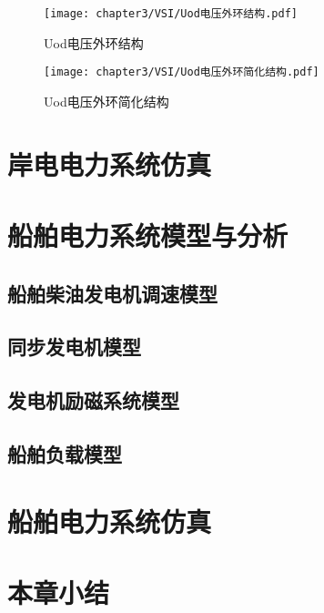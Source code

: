\begin{figure}[!htp]
	\centering
	\texttt{[image: chapter3/VSI/Uod电压外环结构.pdf]}
	\caption{Uod电压外环结构}
	\label{fig:Uod电压外环结构}
\end{figure}

\begin{figure}[!htp]
	\centering
	\texttt{[image: chapter3/VSI/Uod电压外环简化结构.pdf]}
	\caption{Uod电压外环简化结构}
	\label{fig:Uod电压外环简化结构}
\end{figure}

\section{岸电电力系统仿真}


\section{船舶电力系统模型与分析}

\subsection{船舶柴油发电机调速模型}

\subsection{同步发电机模型}

\subsection{发电机励磁系统模型}

\subsection{船舶负载模型}

\section{船舶电力系统仿真}


\section{本章小结}